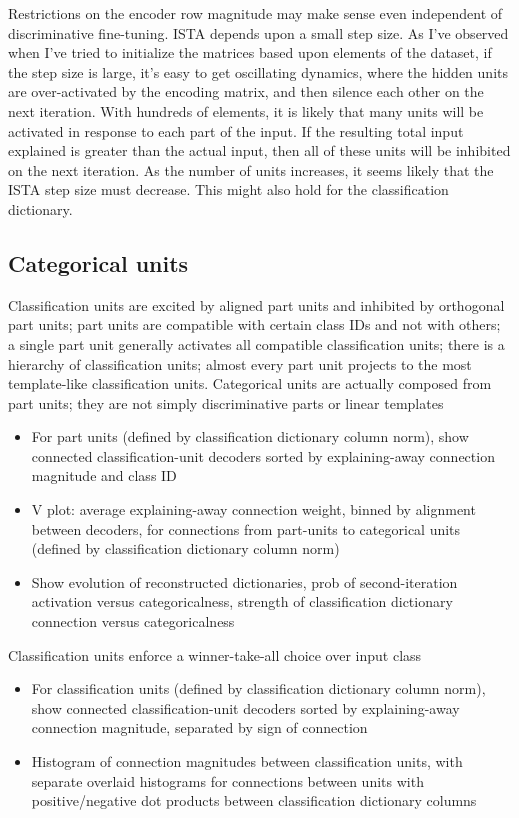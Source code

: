 \documentclass{article} %
\begin{document}
Restrictions on the encoder row magnitude may make sense even independent of discriminative fine-tuning.  ISTA depends upon a small step size.  As I've observed when I've tried to initialize the matrices based upon elements of the dataset, if the step size is large, it's easy to get oscillating dynamics, where the hidden units are over-activated by the encoding matrix, and then silence each other on the next iteration.  With hundreds of elements, it is likely that many units will be activated in response to each part of the input.  If the resulting total input explained is greater than the actual input, then all of these units will be inhibited on the next iteration.  As the number of units increases, it seems likely that the ISTA step size must decrease.  This might also hold for the classification dictionary.


\subsection{Categorical units}

Classification units are excited by aligned part units and inhibited by orthogonal part units; part units are compatible with certain class IDs and not with others; a single part unit generally activates all compatible classification units; there is a hierarchy of classification units; almost every part unit projects to the most template-like classification units.  Categorical units are actually composed from part units; they are not simply discriminative parts or linear templates
\begin{itemize}
\item For part units (defined by classification dictionary column norm), show connected classification-unit decoders sorted by explaining-away connection magnitude and class ID
\item V plot: average explaining-away connection weight, binned by alignment between decoders, for connections from part-units to categorical units (defined by classification dictionary column norm)
\item Show evolution of reconstructed dictionaries, prob of second-iteration activation versus categoricalness, strength of classification dictionary connection versus categoricalness
\end{itemize}

Classification units enforce a winner-take-all choice over input class
\begin{itemize}
\item For classification units (defined by classification dictionary column norm), show connected classification-unit decoders sorted by explaining-away connection magnitude, separated by sign of connection 
\item Histogram of connection magnitudes between classification units, with separate overlaid histograms for connections between units with positive/negative dot products between classification dictionary columns
\end{itemize}
\end{document}
